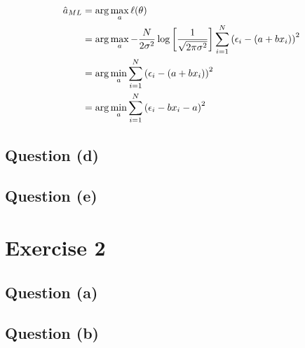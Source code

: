 \documentclass[12pt]{article}
\begin{document}
\begin{align*}
    \hat a_{ML}
     & =\arg \max_a \ell(\theta)                                                                                                                    \\
     & = \arg \max_a -\frac{N}{2 \sigma^2}\log \left[\frac{1}{\sqrt{2 \pi \sigma^{2}}}\right] \sum_{i=1}^N \left(\epsilon_i - (a + bx_i)\right)^{2} \\
     & = \arg \min_a  \sum_{i=1}^N \left(\epsilon_i - (a + bx_i)\right)^{2}                                                                         \\
     & = \arg \min_a  \sum_{i=1}^N \left(\epsilon_i - bx_i - a\right)^{2}                                                                           \\
\end{align*}


\subsection{Question (d)}
\subsection{Question (e)}
\section{Exercise 2} %
\subsection{Question (a)}
\subsection{Question (b)}

\clearpage

\end{document}
